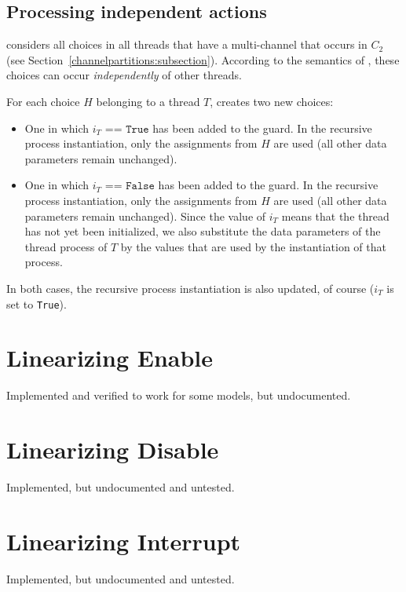 \begin{samepage}
\subsection{Processing independent actions}

\lpeq{} considers all choices in all threads that have a multi-channel that occurs in $C_2$ (see Section~\ref{channelpartitions:subsection}).
According to the semantics of \txs{}, these choices can occur \emph{independently} of other threads.

For each choice $H$ belonging to a thread $T$, \lpeq{} creates two new choices:
\begin{itemize}
\item One in which $i_T \texttt{ == True}$ has been added to the guard.
In the recursive process instantiation, only the assignments from $H$ are used (all other data parameters remain unchanged).
\item One in which $i_T \texttt{ == False}$ has been added to the guard.
In the recursive process instantiation, only the assignments from $H$ are used (all other data parameters remain unchanged).
Since the value of $i_T$ means that the thread has not yet been initialized, we also substitute the data parameters of the thread process of $T$ by the values that are used by the instantiation of that process.
\end{itemize}
In both cases, the recursive process instantiation is also updated, of course ($i_T$ is set to \texttt{True}).
\end{samepage}

\section{Linearizing Enable}

Implemented and verified to work for some models, but undocumented.

\section{Linearizing Disable}

Implemented, but undocumented and untested.

\section{Linearizing Interrupt}

Implemented, but undocumented and untested.

